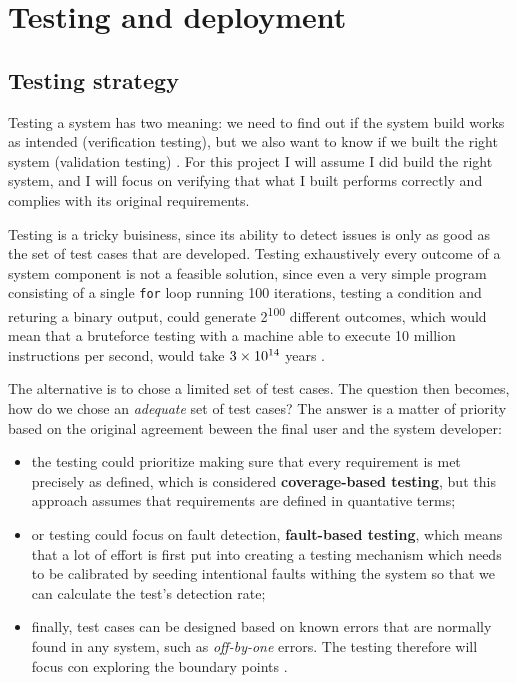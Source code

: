\chapter{Testing and deployment}

\section{Testing strategy}
Testing a system has two meaning: we need to find out if the system build works
as intended (verification testing), but we also want to know if we built the
right system (validation testing) \cite{VV08}. For this project I will assume
I did build the right system, and I will focus on verifying that what I built
performs correctly and complies with its original requirements.

Testing is a tricky buisiness, since its ability to detect issues is only as
good as the set of test cases that are developed. Testing exhaustively every
outcome of a system component is not a feasible solution, since even a very
simple program consisting of a single \texttt{for} loop running 100 iterations,
testing a condition and returing a binary output, could generate
2\textsuperscript{100} different outcomes, which would mean that a bruteforce
testing with a machine able to execute 10 million instructions per second, would
take $3 \times 10\textsuperscript{14}$ years \cite{VV08}.

The alternative is to chose a limited set of test cases. The question then
becomes, how do we chose an \emph{adequate} set of test cases? The answer is a
matter of priority based on the original agreement beween the final user and the
system developer:
\begin{itemize}
  \item the testing could prioritize making sure that every requirement is met
  precisely as defined, which is considered \textbf{coverage-based testing}, but
  this approach assumes that requirements are defined in quantative terms;
  \item or testing could focus on fault detection, \textbf{fault-based testing},
  which means that a lot of effort is first put into creating a testing
  mechanism which needs to be calibrated by seeding intentional faults withing
  the system so that we can calculate the test's detection rate;
  \item finally, test cases can be designed based on known errors
  that are normally found in any system, such as \emph{off-by-one} errors. The
  testing therefore will focus con exploring the boundary points \cite{VV08}.
\end{itemize}

